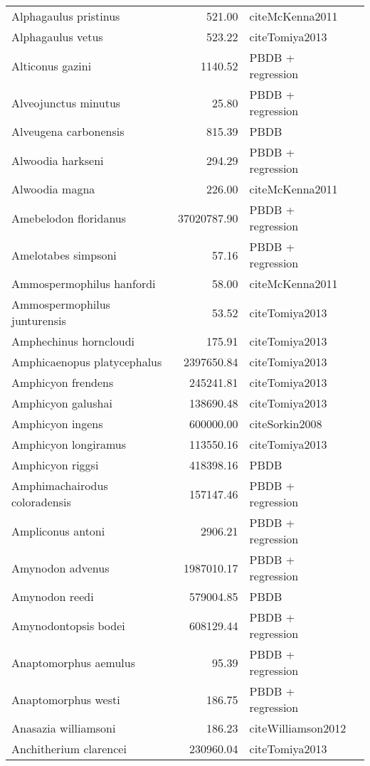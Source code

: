 \begin{table}[ht]
\begin{tabular}{lrll}
  Alphagaulus pristinus & 521.00 & cite{McKenna2011} &  \\ 
  Alphagaulus vetus & 523.22 & cite{Tomiya2013} &  \\ 
  Alticonus gazini & 1140.52 & PBDB + regression &  \\ 
  Alveojunctus minutus & 25.80 & PBDB + regression &  \\ 
  Alveugena carbonensis & 815.39 & PBDB &  \\ 
  Alwoodia harkseni & 294.29 & PBDB + regression &  \\ 
  Alwoodia magna & 226.00 & cite{McKenna2011} &  \\ 
  Amebelodon floridanus & 37020787.90 & PBDB + regression &  \\ 
  Amelotabes simpsoni & 57.16 & PBDB + regression &  \\ 
  Ammospermophilus hanfordi & 58.00 & cite{McKenna2011} &  \\ 
  Ammospermophilus junturensis & 53.52 & cite{Tomiya2013} &  \\ 
  Amphechinus horncloudi & 175.91 & cite{Tomiya2013} &  \\ 
  Amphicaenopus platycephalus & 2397650.84 & cite{Tomiya2013} &  \\ 
  Amphicyon frendens & 245241.81 & cite{Tomiya2013} &  \\ 
  Amphicyon galushai & 138690.48 & cite{Tomiya2013} &  \\ 
  Amphicyon ingens & 600000.00 & cite{Sorkin2008} &  \\ 
  Amphicyon longiramus & 113550.16 & cite{Tomiya2013} &  \\ 
  Amphicyon riggsi & 418398.16 & PBDB &  \\ 
  Amphimachairodus coloradensis & 157147.46 & PBDB + regression &  \\ 
  Ampliconus antoni & 2906.21 & PBDB + regression &  \\ 
  Amynodon advenus & 1987010.17 & PBDB + regression &  \\ 
  Amynodon reedi & 579004.85 & PBDB &  \\ 
  Amynodontopsis bodei & 608129.44 & PBDB + regression &  \\ 
  Anaptomorphus aemulus & 95.39 & PBDB + regression &  \\ 
  Anaptomorphus westi & 186.75 & PBDB + regression &  \\ 
  Anasazia williamsoni & 186.23 & cite{Williamson2012} &  \\ 
  Anchitherium clarencei & 230960.04 & cite{Tomiya2013} &  \\ 

\end{tabular}
\end{table}
